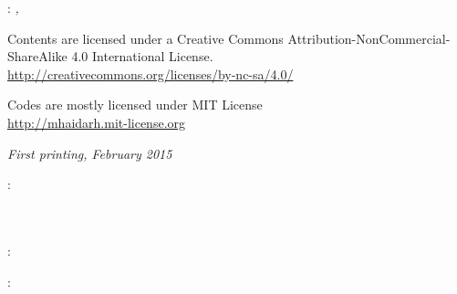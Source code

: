 \thispagestyle{empty}

\hfill

\vfill

\noindent\myName: \textit{\myTitle,} %
\textcopyright\ \myTime

\bigskip

\noindent Contents are licensed under a Creative Commons Attribution-NonCommercial-ShareAlike 4.0 International License.\\
\url{http://creativecommons.org/licenses/by-nc-sa/4.0/}

\medskip

\noindent Codes are mostly licensed under MIT License\\
\url{http://mhaidarh.mit-license.org}

\bigskip

\noindent \textit{First printing, February 2015}

\bigskip

\noindent{}: \\
\mySupervisor \\
\myExaminerA \\
\myExaminerB

\medskip

\noindent{}: \\
\myLocation

\medskip

\noindent{}: \\
\myTime

